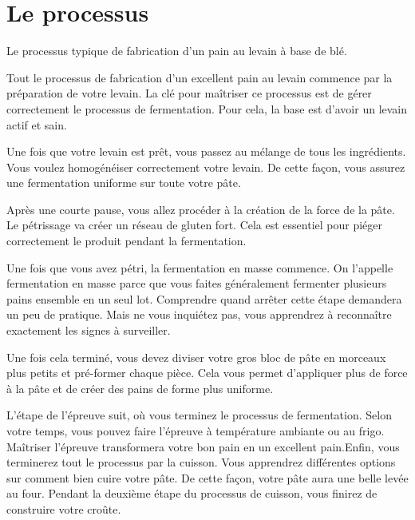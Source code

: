 \section{Le processus}

\begin{flowchart}[!htb]
\begin{center}
  
  \caption{Le processus typique de fabrication d'un pain au levain à base de blé.}%
  \label{fig:wheat-sourdough-process}
\end{center}
\end{flowchart}

Tout le processus de fabrication d'un excellent pain au levain commence par la préparation de votre levain. La clé pour maîtriser ce processus est de gérer correctement le processus de fermentation. Pour cela, la base est d'avoir un levain actif et sain.

Une fois que votre levain est prêt, vous passez au mélange de tous les ingrédients. Vous voulez homogénéiser correctement votre levain. De cette façon, vous assurez une fermentation uniforme sur toute votre pâte.

Après une courte pause, vous allez procéder à la création de la force de la pâte. Le pétrissage va créer un réseau de gluten fort. Cela est essentiel pour piéger correctement le  produit pendant la fermentation.

Une fois que vous avez pétri, la fermentation en masse commence. On l'appelle fermentation en masse parce que vous faites généralement fermenter plusieurs pains ensemble en un seul lot. Comprendre quand arrêter cette étape demandera un peu de pratique. Mais ne vous inquiétez pas, vous apprendrez à reconnaître exactement les signes à surveiller.

Une fois cela terminé, vous devez diviser votre gros bloc de pâte en morceaux plus petits et pré-former chaque pièce. Cela vous permet d'appliquer plus de force à la pâte et de créer des pains de forme plus uniforme.

L'étape de l'épreuve suit, où vous terminez le processus de fermentation. Selon votre temps, vous pouvez faire l'épreuve à température ambiante ou au frigo. Maîtriser l'épreuve transformera votre bon pain en un excellent pain.Enfin, vous terminerez tout le processus par la cuisson. Vous apprendrez différentes
options sur comment bien cuire votre pâte. De cette façon, votre
pâte aura une belle levée au four. Pendant la deuxième
étape du processus de cuisson, vous finirez de construire votre croûte.

